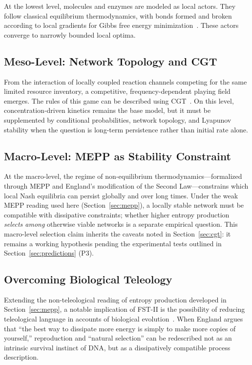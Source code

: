 \documentclass[12pt,a4paper]{article}
\theoremstyle{remark}
\begin{document}
At the lowest level, molecules and enzymes are modeled as local actors. They follow classical equilibrium thermodynamics, with bonds formed and broken according to local gradients for Gibbs free energy minimization~\citep{MetabolicNash}. These actors converge to narrowly bounded local optima.

\subsection{Meso-Level: Network Topology and CGT}

From the interaction of locally coupled reaction channels competing for the same limited resource inventory, a competitive, frequency-dependent playing field emerges. The rules of this game can be described using CGT~\citep{AzoarcusPNAS}. On this level, concentration-driven kinetics remains the base model, but it must be supplemented by conditional probabilities, network topology, and Lyapunov stability when the question is long-term persistence rather than initial rate alone.

\subsection{Macro-Level: MEPP as Stability Constraint}

At the macro-level, the regime of non-equilibrium thermodynamics---formalized through MEPP and England's modification of the Second Law---constrains which local Nash equilibria can persist globally and over long times. Under the weak MEPP reading used here (Section~\ref{sec:mepp}), a locally stable network must be compatible with dissipative constraints; whether higher entropy production \emph{selects among} otherwise viable networks is a separate empirical question. This macro-level selection claim inherits the caveats noted in Section~\ref{sec:cgt}: it remains a working hypothesis pending the experimental tests outlined in Section~\ref{sec:predictions} (P3).

\subsection{Overcoming Biological Teleology}

Extending the non-teleological reading of entropy production developed in Section~\ref{sec:mepp}, a notable implication of FST-II is the possibility of reducing teleological language in accounts of biological evolution~\citep{UnbecomingBeing}. When England argues that ``the best way to dissipate more energy is simply to make more copies of yourself,'' reproduction and ``natural selection'' can be redescribed not as an intrinsic survival instinct of DNA, but as a dissipatively compatible process description.
\end{document}
